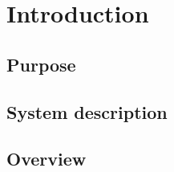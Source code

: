\section{Introduction}
\label{sec:introduction}


\subsection{Purpose}
\label{sub:purpose}



\subsection{System description}
\label{sub:system_description}



\subsection{Overview}
\label{sub:overview}



% 
% 


